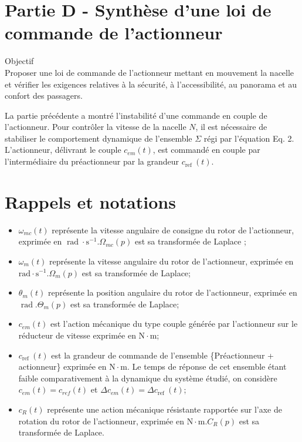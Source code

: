 \documentclass[10pt]{article}
\begin{document}
\section*{Partie D - Synthèse d'une loi de commande de l'actionneur}
Objectif\\
Proposer une loi de commande de l'actionneur mettant en mouvement la nacelle et vérifier les exigences relatives à la sécurité, à l'accessibilité, au panorama et au confort des passagers.

La partie précédente a montré l'instabilité d'une commande en couple de l'actionneur. Pour contrôler la vitesse de la nacelle $N$, il est nécessaire de stabiliser le comportement dynamique de l'ensemble $\Sigma$ régi par l'équation Eq. 2. L'actionneur, délivrant le couple $c_{e m}(t)$, est commandé en couple par l'intermédiaire du préactionneur par la grandeur $c_{\text {ref }}(t)$.

\section*{Rappels et notations}
\begin{itemize}
  \item[-] $\omega_{m c}(t)$ représente la vitesse angulaire de consigne du rotor de l'actionneur, exprimée en $\operatorname{rad} \cdot \mathrm{s}^{-1} . \Omega_{m c}(p)$ est sa transformée de Laplace ;
  \item[-] $\omega_{m}(t)$ représente la vitesse angulaire du rotor de l'actionneur, exprimée en $\mathrm{rad} \cdot \mathrm{s}^{-1} . \Omega_{m}(p)$ est sa transformée de Laplace;
  \item[-] $\theta_{m}(t)$ représente la position angulaire du rotor de l'actionneur, exprimée en $\operatorname{rad} . \Theta_{m}(p)$ est sa transformée de Laplace;
  \item[-] $c_{e m}(t)$ est l'action mécanique du type couple générée par l'actionneur sur le réducteur de vitesse exprimée en $\mathrm{N} \cdot \mathrm{m}$;
  \item[-] $c_{\text {ref }}(t)$ est la grandeur de commande de l'ensemble \{Préactionneur + actionneur\} exprimée en $\mathrm{N} \cdot \mathrm{m}$. Le temps de réponse de cet ensemble étant faible comparativement à la dynamique du système étudié, on considère $c_{e m}(t)=c_{r e f}(t)$ et $\Delta c_{e m}(t)=\Delta c_{\text {ref }}(t)$;
  \item[-] $c_{R}(t)$ représente une action mécanique résistante rapportée sur l'axe de rotation du rotor de l'actionneur, exprimée en $\mathrm{N} \cdot \mathrm{m} . C_{R}(p)$ est sa transformée de Laplace.
\end{itemize}
\end{document}
